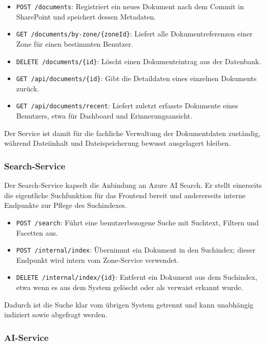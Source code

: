 \begin{itemize}
    \item \texttt{POST /documents}: Registriert ein neues Dokument nach dem Commit in SharePoint und speichert dessen Metadaten.
    \item \texttt{GET /documents/by-zone/\{zoneId\}}: Liefert alle Dokumentreferenzen einer Zone für einen bestimmten Benutzer.
    \item \texttt{DELETE /documents/\{id\}}: Löscht einen Dokumenteintrag aus der Datenbank.
    \item \texttt{GET /api/documents/\{id\}}: Gibt die Detaildaten eines einzelnen Dokuments zurück.
    \item \texttt{GET /api/documents/recent}: Liefert zuletzt erfasste Dokumente eines Benutzers, etwa für Dashboard und Erinnerungsansicht.
\end{itemize}

Der Service ist damit für die fachliche Verwaltung der Dokumentdaten zuständig,
während Dateiinhalt und Dateispeicherung bewusst ausgelagert bleiben.

\subsubsection{Search-Service}

Der Search-Service kapselt die Anbindung an Azure AI Search. Er stellt einerseits
die eigentliche Suchfunktion für das Frontend bereit und andererseits interne
Endpunkte zur Pflege des Suchindexes.

\begin{itemize}
    \item \texttt{POST /search}: Führt eine benutzerbezogene Suche mit Suchtext, Filtern und Facetten aus.
    \item \texttt{POST /internal/index}: Übernimmt ein Dokument in den Suchindex; dieser Endpunkt wird intern vom Zone-Service verwendet.
    \item \texttt{DELETE /internal/index/\{id\}}: Entfernt ein Dokument aus dem Suchindex, etwa wenn es aus dem System gelöscht oder als verwaist erkannt wurde.
\end{itemize}

Dadurch ist die Suche klar vom übrigen System getrennt und kann unabhängig
indiziert sowie abgefragt werden.

\subsubsection{AI-Service}

